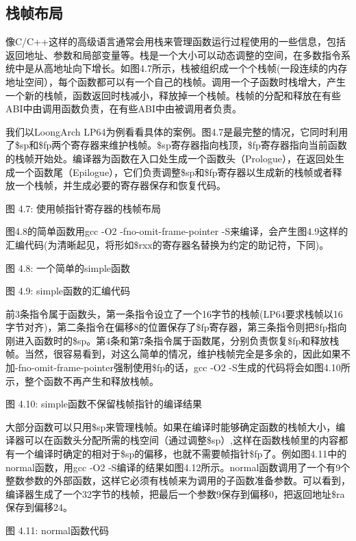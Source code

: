 \documentclass[]{ctexbook}
\begin{document}
\hypertarget{ux6808ux5e27ux5e03ux5c40}{%
\subsection{栈帧布局}\label{ux6808ux5e27ux5e03ux5c40}}

像C/C++这样的高级语言通常会用栈来管理函数运行过程使用的一些信息，包括返回地址、参数和局部变量等。栈是一个大小可以动态调整的空间，在多数指令系统中是从高地址向下增长。如图4.7所示，栈被组织成一个个栈帧(一段连续的内存地址空间），每个函数都可以有一个自己的栈帧。调用一个子函数时栈增大，产生一个新的栈帧，函数返回时栈减小，释放掉一个栈帧。栈帧的分配和释放在有些ABI中由调用函数负责，在有些ABI中由被调用者负责。

我们以LoongArch LP64为例看看具体的案例。图4.7是最完整的情况，它同时利用了\$sp和\$fp两个寄存器来维护栈帧。\$sp寄存器指向栈顶，\$fp寄存器指向当前函数的栈帧开始处。编译器为函数在入口处生成一个函数头（Prologue），在返回处生成一个函数尾（Epilogue），它们负责调整\$sp和\$fp寄存器以生成新的栈帧或者释放一个栈帧，并生成必要的寄存器保存和恢复代码。

图 4.7: 使用帧指针寄存器的栈帧布局

图4.8的简单函数用gcc -O2 -fno-omit-frame-pointer -S来编译，会产生图4.9这样的汇编代码(为清晰起见，将形如\$rxx的寄存器名替换为约定的助记符，下同)。

图 4.8: 一个简单的simple函数

图 4.9: simple函数的汇编代码

前3条指令属于函数头，第一条指令设立了一个16字节的栈帧(LP64要求栈帧以16字节对齐)，第二条指令在偏移8的位置保存了\$fp寄存器，第三条指令则把\$fp指向刚进入函数时的\$sp。第4条和第7条指令属于函数尾，分别负责恢复\$fp和释放栈帧。当然，很容易看到，对这么简单的情况，维护栈帧完全是多余的，因此如果不加-fno-omit-frame-pointer强制使用\$fp的话，gcc -O2 -S生成的代码将会如图4.10所示，整个函数不再产生和释放栈帧。

图 4.10: simple函数不保留栈帧指针的编译结果

大部分函数可以只用\$sp来管理栈帧。如果在编译时能够确定函数的栈帧大小，编译器可以在函数头分配所需的栈空间（通过调整\$sp）,这样在函数栈帧里的内容都有一个编译时确定的相对于\$sp的偏移，也就不需要帧指针\$fp了。例如图4.11中的normal函数，用gcc -O2 -S编译的结果如图4.12所示。normal函数调用了一个有9个整数参数的外部函数，这样它必须有栈帧来为调用的子函数准备参数。可以看到，编译器生成了一个32字节的栈帧，把最后一个参数9保存到偏移0，把返回地址\$ra保存到偏移24。

图 4.11: normal函数代码
\end{document}
